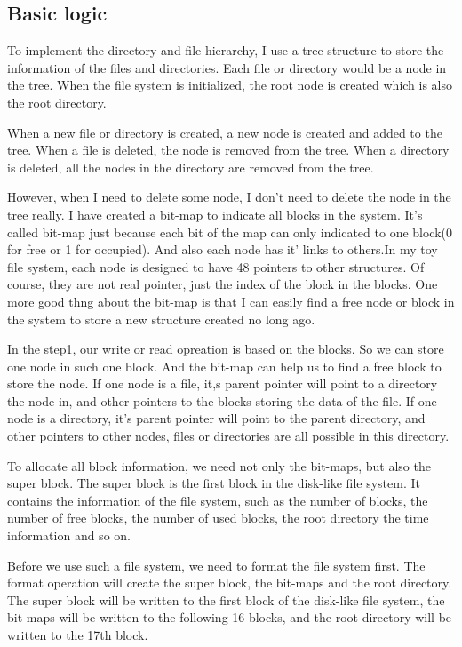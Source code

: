 \documentclass[a4paper]{article}
\begin{document}
\subsection{Basic logic}

To implement the directory and file hierarchy, I use a tree structure to store the information of the files and directories. Each file or directory would be a node in the tree. When the file system is initialized, the root node is created which is also the root directory. 

When a new file or directory is created, a new node is created and added to the tree. When a file is deleted, the node is removed from the tree. When a directory is deleted, all the nodes in the directory are removed from the tree. 

However, when I need to delete some node, I don't need to delete the node in the tree really. I have created a bit-map to indicate all blocks in the system. It's called bit-map just because each bit of the map can only indicated to one block(0 for free or 1 for occupied). And also each node has it' links to others.In my toy file system, each node is designed to have 48 pointers to other structures. Of course, they are not real pointer, just the index of the block in the blocks. One more good thng about the bit-map is that I can easily find a free node or block in the system to store a new structure created no long ago.

In the step1, our write or read opreation is based on the blocks. So we can store one node in such one block. And the bit-map can help us to find a free block to store the node. If one node is a file, it,s parent pointer will point to a directory the node in, and other pointers to the blocks storing the data of the file. If one node is a directory, it's parent pointer will point to the parent directory, and other pointers to other nodes, files or directories are all possible in this directory.

To allocate all block information, we need not only the bit-maps, but also the super block. The super block is the first block in the disk-like file system. It contains the information of the file system, such as the number of blocks, the number of free blocks, the number of used blocks, the root directory the time information and so on.

Before we use such a file system, we need to format the file system first. The format operation will create the super block, the bit-maps and the root directory. The super block will be written to the first block of the disk-like file system, the bit-maps will be written to the following 16 blocks, and the root directory will be written to the 17th block.
\end{document}
